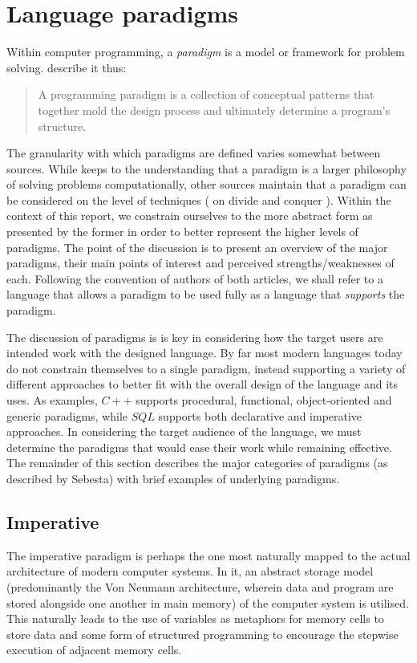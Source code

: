 \section{Language paradigms}
Within computer programming, a \emph{paradigm} is a model or framework for problem solving. \citeauthor{paradigms1992} describe it thus:

\begin{quote}
A programming paradigm is a collection of conceptual patterns that together mold the design process and ultimately determine a program's structure.
\end{quote}

The granularity with which paradigms are defined varies somewhat between sources. While \citeauthor{paradigms1992} keeps to the understanding that a paradigm is a larger philosophy of solving problems computationally, other sources maintain that a paradigm can be considered on the level of techniques (\citeauthor{paradigms1978} on divide and conquer \cite{paradigms1978}). Within the context of this report, we constrain ourselves to the more abstract form as presented by the former in order to better represent the higher levels of paradigms. The point of the discussion is to present an overview of the major paradigms, their main points of interest and perceived strengths/weaknesses of each. Following the convention of authors of both articles, we shall refer to a language that allows a paradigm to be used fully as a language that \emph{supports} the paradigm.

The discussion of paradigms is is key in considering how the target users are intended work with the designed language. By far most modern languages today do not constrain themselves to a single paradigm, instead supporting a variety of different approaches to better fit with the overall design of the language and its uses. As examples, $C++$ supports procedural, functional, object-oriented and generic paradigms, while $SQL$ supports both declarative and imperative approaches. In considering the target audience of the language, we must determine the paradigms that would ease their work while remaining effective. The remainder of this section describes the major categories of paradigms (as described by Sebesta\cite{concepts_prog_lang}) with brief examples of underlying paradigms.

\subsection{Imperative}
The imperative paradigm is perhaps the one most naturally mapped to the actual architecture of modern computer systems. In it, an abstract storage model (predominantly the Von Neumann architecture, wherein data and program are stored alongside one another in main memory) of the computer system is utilised. This naturally leads to the use of variables as metaphors for memory cells to store data and some form of structured programming to encourage the stepwise execution of adjacent memory cells.

